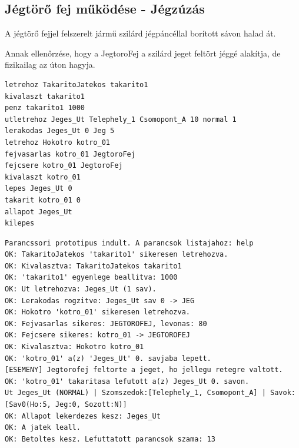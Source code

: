 \subsection{Jégtörő fej működése - Jégzúzás}
\begin{test-case-description}
    A jégtörő fejjel felszerelt jármű szilárd jégpáncéllal borított sávon halad át.
\end{test-case-description}
\begin{test-case-function}
    Annak ellenőrzése, hogy a JegtoroFej a szilárd jeget feltört jéggé alakítja, de fizikailag az úton hagyja.
\end{test-case-function}
\begin{test-case-input}
\begin{verbatim}
letrehoz TakaritoJatekos takarito1
kivalaszt takarito1
penz takarito1 1000
utletrehoz Jeges_Ut Telephely_1 Csomopont_A 10 normal 1
lerakodas Jeges_Ut 0 Jeg 5
letrehoz Hokotro kotro_01
fejvasarlas kotro_01 JegtoroFej
fejcsere kotro_01 JegtoroFej
kivalaszt kotro_01
lepes Jeges_Ut 0
takarit kotro_01 0
allapot Jeges_Ut
kilepes
\end{verbatim}
\end{test-case-input}
\begin{test-case-output}
\begin{verbatim}
Parancssori prototipus indult. A parancsok listajahoz: help
OK: TakaritoJatekos 'takarito1' sikeresen letrehozva.
OK: Kivalasztva: TakaritoJatekos takarito1
OK: 'takarito1' egyenlege beallitva: 1000
OK: Ut letrehozva: Jeges_Ut (1 sav).
OK: Lerakodas rogzitve: Jeges_Ut sav 0 -> JEG
OK: Hokotro 'kotro_01' sikeresen letrehozva.
OK: Fejvasarlas sikeres: JEGTOROFEJ, levonas: 80
OK: Fejcsere sikeres: kotro_01 -> JEGTOROFEJ
OK: Kivalasztva: Hokotro kotro_01
OK: 'kotro_01' a(z) 'Jeges_Ut' 0. savjaba lepett.
[ESEMENY] Jegtorofej feltorte a jeget, ho jellegu retegre valtott.
OK: 'kotro_01' takaritasa lefutott a(z) Jeges_Ut 0. savon.
Ut Jeges_Ut (NORMAL) | Szomszedok:[Telephely_1, Csomopont_A] | Savok: [Sav0(Ho:5, Jeg:0, Sozott:N)]
OK: Allapot lekerdezes kesz: Jeges_Ut
OK: A jatek leall.
OK: Betoltes kesz. Lefuttatott parancsok szama: 13
\end{verbatim}
\end{test-case-output}

